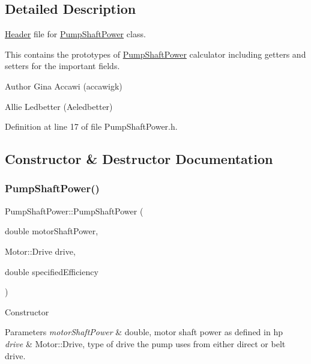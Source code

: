 \subsection{Detailed Description}
\hyperlink{class_header}{Header} file for \hyperlink{class_pump_shaft_power}{Pump\+Shaft\+Power} class. 

This contains the prototypes of \hyperlink{class_pump_shaft_power}{Pump\+Shaft\+Power} calculator including getters and setters for the important fields.

\begin{DoxyAuthor}{Author}
Gina Accawi (accawigk) 

Allie Ledbetter (Aeledbetter) 
\end{DoxyAuthor}


Definition at line 17 of file Pump\+Shaft\+Power.\+h.



\subsection{Constructor \& Destructor Documentation}
\mbox{\label{class_pump_shaft_power_a7eea468dbb3efe1f0e8ae77a2d16efe2}} 
\subsubsection{\texorpdfstring{Pump\+Shaft\+Power()}{PumpShaftPower()}}
{\footnotesize\ttfamily Pump\+Shaft\+Power\+::\+Pump\+Shaft\+Power (\begin{DoxyParamCaption}\item[{double}]{motor\+Shaft\+Power,  }\item[{Motor\+::\+Drive}]{drive,  }\item[{double}]{specified\+Efficiency }\end{DoxyParamCaption})\hspace{0.3cm}{\ttfamily [inline]}}

Constructor 
\begin{DoxyParams}{Parameters}
{\em motor\+Shaft\+Power} & double, motor shaft power as defined in hp \\
\hline
{\em drive} & Motor\+::\+Drive, type of drive the pump uses from either direct or belt drive. \\
\hline
\end{DoxyParams}


